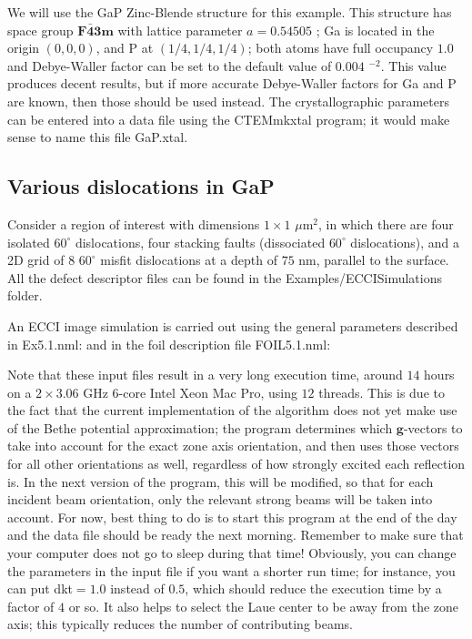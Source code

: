 \documentclass[DIV=calc, paper=letter, fontsize=11pt]{scrartcl}	 %
\begin{document}
We will use the GaP Zinc-Blende structure for this example.  This structure has space group $\mathbf{F\bar{4}3m}$ with lattice parameter
$a=0.54505$ \nano\meter; Ga is located in the origin $(0,0,0)$, and P at $(1/4,1/4,1/4)$; both atoms have full occupancy $1.0$
and Debye-Waller factor can be set to the default value of $0.004$ \nano\meter$^{-2}$.  This value produces decent results, but 
if more accurate Debye-Waller factors for Ga and P are known, then those should be used instead.  The crystallographic parameters
can be entered into a data file using the \textsf{CTEMmkxtal} program; it would make sense to name this file \textsf{GaP.xtal}.

\subsection{Various dislocations in GaP}
Consider a region of interest with dimensions $1\times 1$ $\mu$m$^2$, in which there are four isolated $60^{\circ}$ dislocations,
four stacking faults (dissociated $60^{\circ}$ dislocations), and a 2D grid of $8$ $60^{\circ}$ misfit dislocations at a depth of $75$ nm,
parallel to the surface.  All the defect descriptor files can be found in the \textsf{Examples/ECCISimulations} folder. 

An ECCI image simulation is carried out using the general parameters described in \textsf{Ex5.1.nml}:
and in the foil description file \textsf{FOIL5.1.nml}:

Note that these input files result in a very long execution time, around $14$ hours on a $2\times 3.06$ GHz 6-core Intel Xeon Mac Pro,
using $12$ threads.  This is due to the fact that the current implementation of the algorithm does not yet make use of the Bethe potential
approximation; the program determines which $\mathbf{g}$-vectors to take into account for the exact zone axis orientation, and then uses
those vectors for all other orientations as well, regardless of how strongly excited each reflection is.  In the next version of the program,
this will be modified, so that for each incident beam orientation, only the relevant strong beams will be taken into account.
For now, best thing to do is to start this program at the end of the day and the data file should be ready the next morning.  Remember to
make sure that your computer does not go to sleep during that time!  Obviously, you can change the parameters in the input file if you
want a shorter run time; for instance, you can put \textsf{dkt}$=1.0$ instead of $0.5$, which should reduce the execution time by a factor 
of $4$ or so.  It also helps to select the Laue center to be away from the zone axis; this typically reduces the number of contributing beams.
\end{document}
